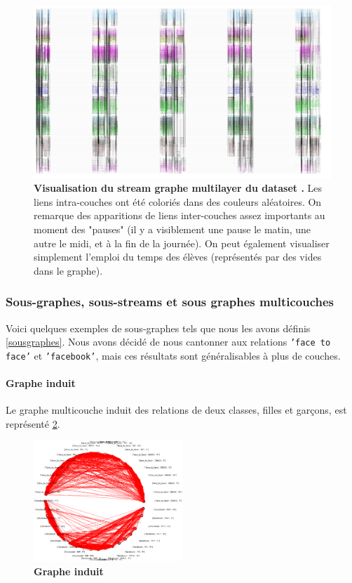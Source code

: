 \documentclass[11pt,a4paper]{article}
\theoremstyle{definition}
\theoremstyle{remark}
\theoremstyle{remark}
\begin{document}
	\begin{figure}[h]
	\includegraphics[width=\textwidth]{lyceeentier.JPG}
	\caption{\textbf{Visualisation du stream graphe multilayer du dataset \cite{cpge}.} Les liens intra-couches ont été coloriés dans des couleurs aléatoires. On remarque des apparitions de liens inter-couches assez importants au moment des "pauses" (il y a visiblement une pause le matin, une autre le midi, et à la fin de la journée). On peut également visualiser simplement l'emploi du temps des élèves (représentés par des vides dans le graphe).}
	\label{lyceeentier}
\end{figure}





\subsubsection{Sous-graphes, sous-streams et sous graphes multicouches}

Voici quelques exemples de sous-graphes tels que nous les avons définis \cref{sousgraphes}. Nous avons décidé de nous cantonner aux relations \texttt{'face to face'} et \texttt{'facebook'}, mais ces résultats sont généralisables à plus de couches. 




\paragraph{Graphe induit}
	Le graphe multicouche induit des relations de deux classes, filles et garçons, est représenté \cref{completinduit}.
	
\begin{figure}[H]
	\centering
	\includegraphics[width=0.5\textwidth]{tout.png}
	\caption{\textbf{Graphe induit}}
	\label{completinduit}
\end{figure}
\end{document}
